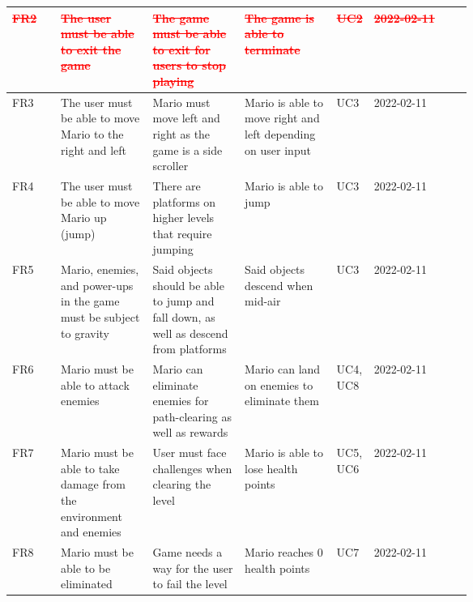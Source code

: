 \documentclass[12pt, titlepage]{article}
\begin{document}
\begin{longtable}{|l|p{0.2\linewidth}|p{0.2\linewidth}|p{0.2\linewidth}|p{0.06\linewidth}|l|}
\textcolor{red}{\st{FR2}}         & \textcolor{red}{\st{The user must be able to exit the game}}                               & \textcolor{red}{\st{The game must be able to exit for users to stop playing}}                              & \textcolor{red}{\st{The game is able to terminate}}                                                                       & \textcolor{red}{\st{UC2}}               & \textcolor{red}{\st{2022-02-11}}       \\ \hline
FR3         & The user must be able to move Mario to the right and left            & Mario must move left and right as the game is a side scroller                        & Mario is able to move right and left depending on user input                                        & UC3               & 2022-02-11       \\ \hline
FR4         & The user must be able to move Mario up (jump)                        & There are platforms on higher levels that require jumping                            & Mario is able to jump                                                                               & UC3               & 2022-02-11       \\ \hline
FR5         & Mario, enemies, and power-ups in the game must be subject to gravity & Said objects should be able to jump and fall down, as well as descend from platforms & Said objects descend when mid-air                                                                   & UC3               & 2022-02-11       \\ \hline
FR6         & Mario must be able to attack enemies                                 & Mario can eliminate enemies for path-clearing as well as rewards                     & Mario can land on enemies to eliminate them                                                         & UC4, UC8          & 2022-02-11       \\ \hline
FR7         & Mario must be able to take damage from the environment and enemies   & User must face challenges when clearing the level                                    & Mario is able to lose health points                                                                 & UC5, UC6          & 2022-02-11       \\ \hline
FR8         & Mario must be able to be eliminated                                  & Game needs a way for the user to fail the level                                      & Mario reaches 0 health points                                                                       & UC7               & 2022-02-11       \\ \hline

\end{longtable}
\end{document}
